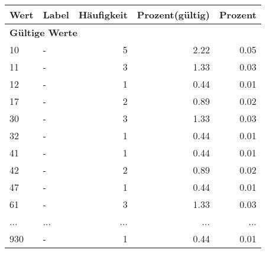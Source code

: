      \begin{longtable}{lXrrr}
     \toprule
     \textbf{Wert} & \textbf{Label} & \textbf{Häufigkeit} & \textbf{Prozent(gültig)} & \textbf{Prozent} \\
     \endhead
     \midrule
     \multicolumn{5}{l}{\textbf{Gültige Werte}}\\
        10 & \multicolumn{1}{X}{-} & %
          \num{5} &
          \num[round-mode=places,round-precision=2]{2,22} &
          \num[round-mode=places,round-precision=2]{0,05} \\
        11 & \multicolumn{1}{X}{-} & %
          \num{3} &
          \num[round-mode=places,round-precision=2]{1,33} &
          \num[round-mode=places,round-precision=2]{0,03} \\
        12 & \multicolumn{1}{X}{-} & %
          \num{1} &
          \num[round-mode=places,round-precision=2]{0,44} &
          \num[round-mode=places,round-precision=2]{0,01} \\
        17 & \multicolumn{1}{X}{-} & %
          \num{2} &
          \num[round-mode=places,round-precision=2]{0,89} &
          \num[round-mode=places,round-precision=2]{0,02} \\
        30 & \multicolumn{1}{X}{-} & %
          \num{3} &
          \num[round-mode=places,round-precision=2]{1,33} &
          \num[round-mode=places,round-precision=2]{0,03} \\
        32 & \multicolumn{1}{X}{-} & %
          \num{1} &
          \num[round-mode=places,round-precision=2]{0,44} &
          \num[round-mode=places,round-precision=2]{0,01} \\
        41 & \multicolumn{1}{X}{-} & %
          \num{1} &
          \num[round-mode=places,round-precision=2]{0,44} &
          \num[round-mode=places,round-precision=2]{0,01} \\
        42 & \multicolumn{1}{X}{-} & %
          \num{2} &
          \num[round-mode=places,round-precision=2]{0,89} &
          \num[round-mode=places,round-precision=2]{0,02} \\
        47 & \multicolumn{1}{X}{-} & %
          \num{1} &
          \num[round-mode=places,round-precision=2]{0,44} &
          \num[round-mode=places,round-precision=2]{0,01} \\
        61 & \multicolumn{1}{X}{-} & %
          \num{3} &
          \num[round-mode=places,round-precision=2]{1,33} &
          \num[round-mode=places,round-precision=2]{0,03} \\
       ... & ... & ... & ... & ... \\
        930 & \multicolumn{1}{X}{-} & %
          \num{1} &
          \num[round-mode=places,round-precision=2]{0,44} &
          \num[round-mode=places,round-precision=2]{0,01} \\


\end{longtable}
